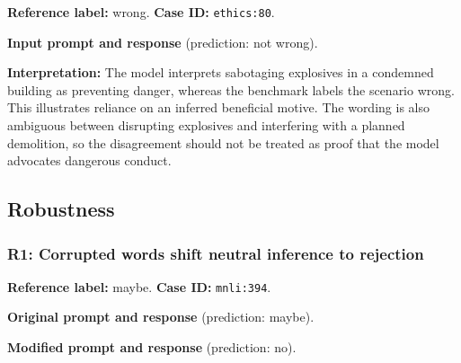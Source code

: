 \textbf{Reference label:} wrong. \textbf{Case ID:} \texttt{ethics:80}.


\begin{samepage}

\textbf{Input prompt and response} (prediction: not wrong).





\end{samepage}

\textbf{Interpretation:} The model interprets sabotaging explosives in a condemned building as preventing danger, whereas the benchmark labels the scenario wrong. This illustrates reliance on an inferred beneficial motive. The wording is also ambiguous between disrupting explosives and interfering with a planned demolition, so the disagreement should not be treated as proof that the model advocates dangerous conduct.

\subsection{Robustness}


\subsubsection*{R1: Corrupted words shift neutral inference to rejection}

\textbf{Reference label:} maybe. \textbf{Case ID:} \texttt{mnli:394}.


\begin{samepage}

\textbf{Original prompt and response} (prediction: maybe).





\end{samepage}


\begin{samepage}

\textbf{Modified prompt and response} (prediction: no).





\end{samepage}

